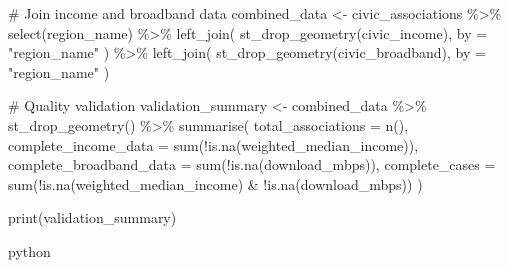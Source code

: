 \documentclass[
  letterpaper,
  DIV=11,
  numbers=noendperiod]{scrartcl}
\newenvironment{Shaded}{\begin{snugshade}}{\end{snugshade}}
\newcommand{\AttributeTok}[1]{\textcolor[rgb]{0.40,0.45,0.13}{#1}}
\newcommand{\CommentTok}[1]{\textcolor[rgb]{0.37,0.37,0.37}{#1}}
\newcommand{\FunctionTok}[1]{\textcolor[rgb]{0.28,0.35,0.67}{#1}}
\newcommand{\NormalTok}[1]{\textcolor[rgb]{0.00,0.23,0.31}{#1}}
\newcommand{\OtherTok}[1]{\textcolor[rgb]{0.00,0.23,0.31}{#1}}
\newcommand{\SpecialCharTok}[1]{\textcolor[rgb]{0.37,0.37,0.37}{#1}}
\newcommand{\StringTok}[1]{\textcolor[rgb]{0.13,0.47,0.30}{#1}}
\begin{document}
\begin{Shaded}
\begin{Highlighting}[]
\CommentTok{\# Join income and broadband data}
\NormalTok{combined\_data }\OtherTok{\textless{}{-}}\NormalTok{ civic\_associations }\SpecialCharTok{\%\textgreater{}\%}
  \FunctionTok{select}\NormalTok{(region\_name) }\SpecialCharTok{\%\textgreater{}\%}
  \FunctionTok{left\_join}\NormalTok{(}
    \FunctionTok{st\_drop\_geometry}\NormalTok{(civic\_income),}
    \AttributeTok{by =} \StringTok{"region\_name"}
\NormalTok{  ) }\SpecialCharTok{\%\textgreater{}\%}
  \FunctionTok{left\_join}\NormalTok{(}
    \FunctionTok{st\_drop\_geometry}\NormalTok{(civic\_broadband),}
    \AttributeTok{by =} \StringTok{"region\_name"}
\NormalTok{  )}

\CommentTok{\# Quality validation}
\NormalTok{validation\_summary }\OtherTok{\textless{}{-}}\NormalTok{ combined\_data }\SpecialCharTok{\%\textgreater{}\%}
  \FunctionTok{st\_drop\_geometry}\NormalTok{() }\SpecialCharTok{\%\textgreater{}\%}
  \FunctionTok{summarise}\NormalTok{(}
    \AttributeTok{total\_associations =} \FunctionTok{n}\NormalTok{(),}
    \AttributeTok{complete\_income\_data =} \FunctionTok{sum}\NormalTok{(}\SpecialCharTok{!}\FunctionTok{is.na}\NormalTok{(weighted\_median\_income)),}
    \AttributeTok{complete\_broadband\_data =} \FunctionTok{sum}\NormalTok{(}\SpecialCharTok{!}\FunctionTok{is.na}\NormalTok{(download\_mbps)),}
    \AttributeTok{complete\_cases =} \FunctionTok{sum}\NormalTok{(}\SpecialCharTok{!}\FunctionTok{is.na}\NormalTok{(weighted\_median\_income) }
                         \SpecialCharTok{\&} \SpecialCharTok{!}\FunctionTok{is.na}\NormalTok{(download\_mbps))}
\NormalTok{  )}

\FunctionTok{print}\NormalTok{(validation\_summary)}
\end{Highlighting}
\end{Shaded}

python
\end{document}

